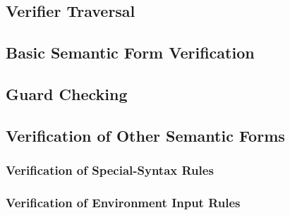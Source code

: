 
\subsection{Verifier Traversal} %
\label{sub:verifier_traversal}


\subsection{Basic Semantic Form Verification} %
\label{sub:basic_semantic_form_verification}


\subsection{Guard Checking} %
\label{sub:guard_checking}


\subsection{Verification of Other Semantic Forms} %
\label{sub:verification_of_other_semantic_forms}

\subsubsection{Verification of Special-Syntax Rules} %
\label{ssub:verification_of_special_syntax_rules}


\subsubsection{Verification of Environment Input Rules} %
\label{ssub:verification_of_environment_input_rules}

